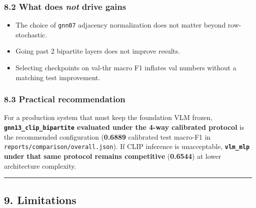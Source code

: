 \documentclass[
  11pt,
]{article}
\providecommand{\tightlist}{%
  \setlength{\itemsep}{0pt}\setlength{\parskip}{0pt}}
\begin{document}
\subsubsection{\texorpdfstring{8.2 What does \emph{not} drive
gains}{8.2 What does not drive gains}}\label{what-does-not-drive-gains}

\begin{itemize}
\tightlist
\item
  The choice of \texttt{gnn07} adjacency normalization does not matter
  beyond row-stochastic.
\item
  Going past 2 bipartite layers does not improve results.
\item
  Selecting checkpoints on val-thr macro F1 inflates val numbers without
  a matching test improvement.
\end{itemize}

\subsubsection{8.3 Practical
recommendation}\label{practical-recommendation}

For a production system that must keep the foundation VLM frozen,
\textbf{\texttt{gnn13\_clip\_bipartite} evaluated under the 4-way
calibrated protocol} is the recommended configuration (\textbf{0.6889}
calibrated test macro-F1 in \texttt{reports/comparison/overall.json}).
If CLIP inference is unacceptable, \textbf{\texttt{vlm\_mlp} under that
same protocol remains competitive} (\textbf{0.6544}) at lower
architecture complexity.

\begin{center}\rule{0.5\linewidth}{0.5pt}\end{center}

\subsection{9. Limitations}\label{limitations}
\end{document}
